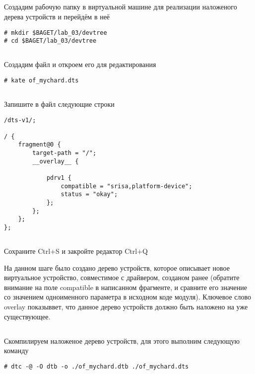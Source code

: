 \subsection{}Создадим рабочую папку в виртуальной машине для реализации наложеного дерева устройств и перейдём в неё
\begin{lstlisting}[style=bash]
# mkdir $BAGET/lab_03/devtree
# cd $BAGET/lab_03/devtree 
\end{lstlisting}

\subsection{}Создадим файл и откроем его для редактирования
\begin{lstlisting}[style=bash]
# kate of_mychard.dts
\end{lstlisting}

\subsection{}Запишите в файл следующие строки
\begin{lstlisting}[style=stdout]
/dts-v1/;

/ {
	fragment@0 {
		target-path = "/";
		__overlay__ {
			
			pdrv1 {
				compatible = "srisa,platform-device";
				status = "okay";
			};
		};
	};
};
\end{lstlisting}

\subsection{}Сохраните Ctrl+S и закройте редактор Ctrl+Q

На данном шаге было создано дерево устройств, которое описывает новое виртуальное устройство, совместимое с драйвером, созданом ранее (обратите внимание на поле compatible в написанном фрагменте, и сравните его значение со значением одноименного параметра в исходном коде модуля). Ключевое слово overlay показыввет, что данное дерево устройств должно быть наложено на уже существующее.  

\subsection{}Скомпилируем наложеное дерево устройств, для этого выполним следующую команду 
\begin{lstlisting}[style=bash]
# dtc -@ -O dtb -o ./of_mychard.dtb ./of_mychard.dts
\end{lstlisting}

